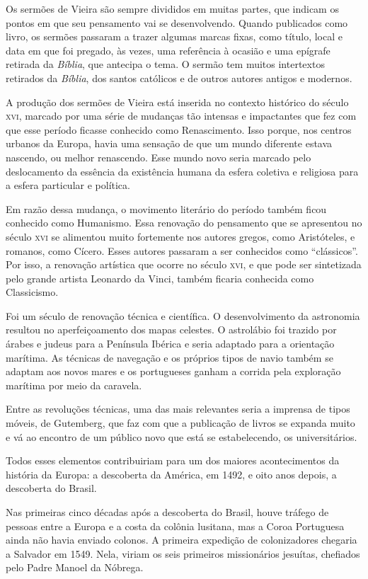Os sermões de Vieira são sempre divididos em muitas partes, que indicam
os pontos em que seu pensamento vai se desenvolvendo. Quando publicados
como livro, os sermões passaram a trazer algumas marcas fixas, como
título, local e data em que foi pregado, às vezes, uma referência à
ocasião e uma epígrafe retirada da \emph{Bíblia}, que antecipa o tema. O
sermão tem muitos intertextos retirados da \emph{Bíblia}, dos santos
católicos e de outros autores antigos e modernos.

A produção dos sermões de Vieira está inserida no contexto histórico 
do século \textsc{xvi}, marcado por uma série de mudanças tão intensas e
impactantes que fez com que esse período ficasse conhecido como
Renascimento. Isso porque, nos centros urbanos da Europa, havia uma
sensação de que um mundo diferente estava nascendo, ou melhor
renascendo. Esse mundo novo seria marcado pelo deslocamento da essência
da existência humana da esfera coletiva e religiosa para a esfera
particular e política.

Em razão dessa mudança, o movimento literário do período também ficou
conhecido como Humanismo. Essa renovação do pensamento que se apresentou
no século \textsc{xvi} se alimentou muito fortemente nos autores gregos, como
Aristóteles, e romanos, como Cícero. Esses autores passaram a ser
conhecidos como ``clássicos''. Por isso, a renovação artística que
ocorre no século \textsc{xvi}, e que pode ser sintetizada pelo grande artista
Leonardo da Vinci, também ficaria conhecida como Classicismo.

Foi um século de renovação técnica e científica. O desenvolvimento da
astronomia resultou no aperfeiçoamento dos mapas celestes. O astrolábio
foi trazido por árabes e judeus para a Península Ibérica e seria
adaptado para a orientação marítima. As técnicas de navegação e os
próprios tipos de navio também se adaptam aos novos mares e os
portugueses ganham a corrida pela exploração marítima por meio da
caravela.

Entre as revoluções técnicas, uma das mais relevantes seria a imprensa
de tipos móveis, de Gutemberg, que faz com que a publicação de livros se
expanda muito e vá ao encontro de um público novo que está se
estabelecendo, os universitários.

Todos esses elementos contribuiriam para um dos maiores acontecimentos
da história da Europa: a descoberta da América, em 1492, e oito anos
depois, a descoberta do Brasil.

Nas primeiras cinco décadas após a descoberta do Brasil, houve tráfego
de pessoas entre a Europa e a costa da colônia lusitana, mas a Coroa
Portuguesa ainda não havia enviado colonos. A primeira expedição de
colonizadores chegaria a Salvador em 1549. Nela, viriam os seis
primeiros missionários jesuítas, chefiados pelo Padre Manoel da Nóbrega.

